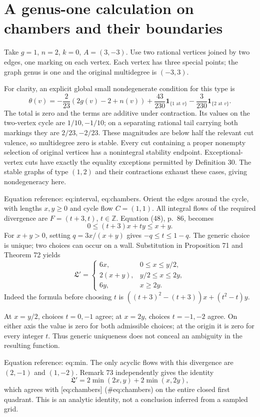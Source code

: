 \documentclass[10pt]{article}
\begin{document}
\section*{A genus-one calculation on chambers and their boundaries}
Take \(g=1\), \(n=2\), \(k=0\), \(A=(3,-3)\). Use two rational vertices joined by two edges, one marking on each vertex. Each vertex has three special points; the graph genus is one and the original multidegree is \((-3,3)\).\par
For clarity, an explicit global small nondegenerate condition for this type is \[\theta(v)=-\frac2{23}(2g(v)-2+n(v))
 +\frac{43}{230}\mathbf1_{\{1\text{ at }v\}}
 -\frac3{230}\mathbf1_{\{2\text{ at }v\}}.\] The total is zero and the terms are additive under contraction. Its values on the two-vertex cycle are \(1/10,-1/10\); on a separating rational tail carrying both markings they are \(2/23,-2/23\). These magnitudes are below half the relevant cut valence, so multidegree zero is stable. Every cut containing a proper nonempty selection of original vertices has a nonintegral stability endpoint. Exceptional-vertex cuts have exactly the equality exceptions permitted by Definition 30. The stable graphs of type \((1,2)\) and their contractions exhaust these cases, giving nondegeneracy here.\par
Equation reference: eq:interval, eq:chambers. Orient the edges around the cycle, with lengths \(x,y\ge0\) and cycle flow \(C=(1,1)\). All integral flows of the required divergence are \(F=(t+3,t)\), \(t\in\mathbb Z\). Equation (48), p. 86, becomes \[
 0\le(t+3)x+ty\le x+y.\] For \(x+y>0\), setting \(q=3x/(x+y)\) gives \(-q\le t\le1-q\). The generic choice is unique; two choices can occur on a wall. Substitution in Proposition 71 and Theorem 72 yields \[
 \mathfrak L'=
 \begin{cases}
 6x,&0\le x\le y/2,\\
 2(x+y),&y/2\le x\le2y,\\
 6y,&x\ge2y.
 \end{cases}\] Indeed the formula before choosing \(t\) is \(((t+3)^2-(t+3))x+(t^2-t)y\).\par
At \(x=y/2\), choices \(t=0,-1\) agree; at \(x=2y\), choices \(t=-1,-2\) agree. On either axis the value is zero for both admissible choices; at the origin it is zero for every integer \(t\). Thus generic uniqueness does not conceal an ambiguity in the resulting function.\par
Equation reference: eq:min. The only acyclic flows with this divergence are \((2,-1)\) and \((1,-2)\). Remark 73 independently gives the identity \[
 \mathfrak L'=2\min(2x,y)+2\min(x,2y),\] which agrees with [eq:chambers] (\#eq:chambers) on the entire closed first quadrant. This is an analytic identity, not a conclusion inferred from a sampled grid.\par
\end{document}
